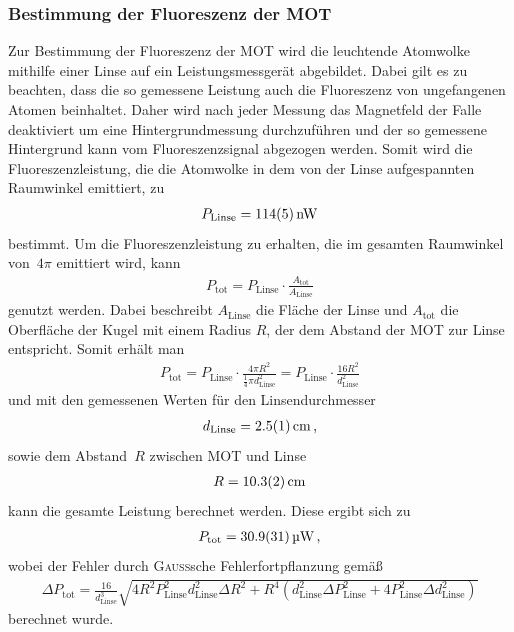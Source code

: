 \documentclass[11pt, a4paper]{article}
\numberwithin{equation}{section}
\begin{document}
\subsubsection{Bestimmung der Fluoreszenz der MOT}
Zur Bestimmung der Fluoreszenz der MOT wird die leuchtende Atomwolke mithilfe einer Linse auf ein Leistungsmessgerät abgebildet.
Dabei gilt es zu beachten, dass die so gemessene Leistung auch die Fluoreszenz von ungefangenen Atomen beinhaltet.
Daher wird nach jeder Messung das Magnetfeld der Falle deaktiviert um eine Hintergrundmessung durchzuführen und der so gemessene Hintergrund kann vom Fluoreszenzsignal abgezogen werden.
Somit wird die Fluoreszenzleistung, die die Atomwolke in dem von der Linse aufgespannten Raumwinkel emittiert, zu
\begin{align*}
	P_\mathrm{Linse} = \SI{114 +- 5}{nW}
\end{align*}
bestimmt.
Um die Fluoreszenzleistung zu erhalten, die im gesamten Raumwinkel von~$4\pi$ emittiert wird, kann
\begin{align*}
	P_\mathrm{tot} = P_\mathrm{Linse} \cdot \frac{A_\mathrm{tot}}{A_\mathrm{Linse}}
\end{align*}
genutzt werden.
Dabei beschreibt $A_\mathrm{Linse}$ die Fläche der Linse und $A_\mathrm{tot}$ die Oberfläche der Kugel mit einem Radius $R$, der dem Abstand der MOT zur Linse entspricht.
Somit erhält man
\begin{align*}
	P_\mathrm{tot} = P_\mathrm{Linse} \cdot \frac{4 \pi R^2}{\frac{1}{4} \pi d_\mathrm{Linse}^2} = P_\mathrm{Linse} \cdot \frac{16 R^2}{d_\mathrm{Linse}^2}
\end{align*}
und mit den gemessenen Werten für den Linsendurchmesser
\begin{align*}
	d_\mathrm{Linse} = \SI{2.5 +- 0.1}{cm} \, \text{,}
\end{align*}
sowie dem Abstand~$R$ zwischen MOT und Linse
\begin{align*}
	R = \SI{10.3 +- 0.2}{cm}
\end{align*}
kann die gesamte Leistung berechnet werden.
Diese ergibt sich zu
\begin{align*}
	P_\mathrm{tot} = \SI{30.9 +- 3.1}{\micro\watt} \, \text{,}
\end{align*}
wobei der Fehler durch \textsc{Gauß}sche Fehlerfortpflanzung gemäß
\begin{align*}
	\Delta P_\mathrm{tot} = \frac{16}{d_\mathrm{Linse}^3} \sqrt{4 R^2 P_\mathrm{Linse}^2 d_\mathrm{Linse}^2 \Delta R^2 + R^4 \left( d_\mathrm{Linse}^2 \Delta P_\mathrm{Linse}^2 + 4 P_\mathrm{Linse}^2 \Delta d_\mathrm{Linse}^2 \right)}
\end{align*}
berechnet wurde.
\end{document}
